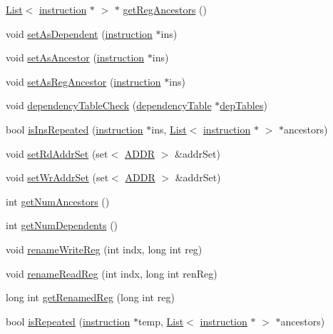 \begin{DoxyCompactItemize}
\item 
\hyperlink{classList}{List}$<$ \hyperlink{classinstruction}{instruction} $\ast$ $>$ $\ast$ \hyperlink{classinstruction_a90450afccd1b4b07bd28b2ee8aabdf6d}{getRegAncestors} ()
\item 
void \hyperlink{classinstruction_ab2ba6828f1256186a787d933a6ca0868}{setAsDependent} (\hyperlink{classinstruction}{instruction} $\ast$ins)
\item 
void \hyperlink{classinstruction_aee7e55cf32812b46267a22bcb53da670}{setAsAncestor} (\hyperlink{classinstruction}{instruction} $\ast$ins)
\item 
void \hyperlink{classinstruction_ab89bab28eb321e32fddfb44354c8245f}{setAsRegAncestor} (\hyperlink{classinstruction}{instruction} $\ast$ins)
\item 
void \hyperlink{classinstruction_ab21a5713ecebfd1b6b6c8aeed06e4679}{dependencyTableCheck} (\hyperlink{classdependencyTable}{dependencyTable} $\ast$\hyperlink{vliwScheduler_8cpp_ab1dae06b10269a1b683512c8ecb25def}{depTables})
\item 
bool \hyperlink{classinstruction_ab367eab50dc74c47b70de127fc633c9b}{isInsRepeated} (\hyperlink{classinstruction}{instruction} $\ast$ins, \hyperlink{classList}{List}$<$ \hyperlink{classinstruction}{instruction} $\ast$ $>$ $\ast$ancestors)
\item 
void \hyperlink{classinstruction_a379cbb0fb6bbe15168c6eac05a37114f}{setRdAddrSet} (set$<$ \hyperlink{binaryTranslator_2global_8h_aa4557b0650cb21e57e3e4623410832c6}{ADDR} $>$ \&addrSet)
\item 
void \hyperlink{classinstruction_a8928d9fe638fd7307606fac71a31b681}{setWrAddrSet} (set$<$ \hyperlink{binaryTranslator_2global_8h_aa4557b0650cb21e57e3e4623410832c6}{ADDR} $>$ \&addrSet)
\item 
int \hyperlink{classinstruction_a2e29e3536ad20c65b6c7b76ba6e37ad8}{getNumAncestors} ()
\item 
int \hyperlink{classinstruction_adb8073eb7167fc23a3c846db8129b068}{getNumDependents} ()
\item 
void \hyperlink{classinstruction_aabd61e186e80af7dd343e0f142741ed6}{renameWriteReg} (int indx, long int reg)
\item 
void \hyperlink{classinstruction_ae9760e334e7829c4f8504bc8436e2dfb}{renameReadReg} (int indx, long int renReg)
\item 
long int \hyperlink{classinstruction_a35b2a3db2dc9a22bbdcbce797d510c85}{getRenamedReg} (long int reg)
\item 
bool \hyperlink{classinstruction_a8d938a7c74c2bd36d0e5565cf933d9d5}{isRepeated} (\hyperlink{classinstruction}{instruction} $\ast$temp, \hyperlink{classList}{List}$<$ \hyperlink{classinstruction}{instruction} $\ast$ $>$ $\ast$ancestors)

\end{DoxyCompactItemize}
